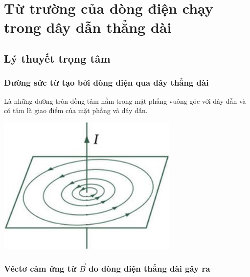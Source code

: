 \chapter{Từ trường của dòng điện chạy trong dây dẫn thẳng dài}
\section{Lý thuyết trọng tâm}
\subsection{Đường sức từ tạo bởi dòng điện qua dây thẳng dài}
Là những đường tròn đồng tâm nằm trong  mặt phẳng vuông góc với dây dẫn và có tâm là giao điểm của mặt phẳng và dây dẫn. 
\begin{center}
	\includegraphics[scale=0.8]{../figs/VN11-PH-26-L-018-1-h106.jpg}
\end{center}
\subsection{Véctơ cảm ứng từ $\vec{B}$ do dòng điện thẳng dài gây ra}

